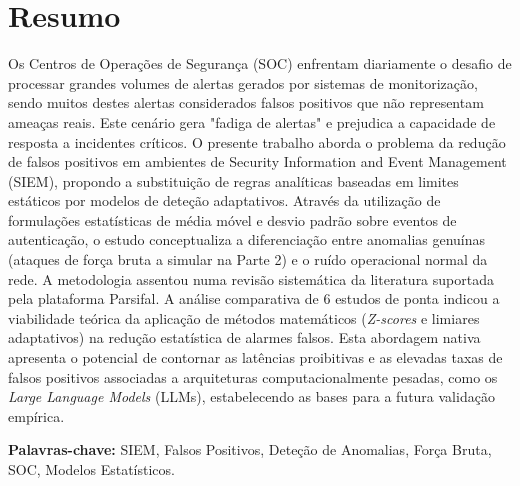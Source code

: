 \documentclass[12pt,a4paper]{article}
\begin{document}
\section*{Resumo}
Os Centros de Operações de Segurança (SOC) enfrentam diariamente o desafio de processar grandes volumes de alertas gerados por sistemas de monitorização, sendo muitos destes alertas considerados falsos positivos que não representam ameaças reais. Este cenário gera "fadiga de alertas" e prejudica a capacidade de resposta a incidentes críticos. O presente trabalho aborda o problema da redução de falsos positivos em ambientes de Security Information and Event Management (SIEM), propondo a substituição de regras analíticas baseadas em limites estáticos por modelos de deteção adaptativos. Através da utilização de formulações estatísticas de média móvel e desvio padrão sobre eventos de autenticação, o estudo conceptualiza a diferenciação entre anomalias genuínas (ataques de força bruta a simular na Parte 2) e o ruído operacional normal da rede. A metodologia assentou numa revisão sistemática da literatura suportada pela plataforma Parsifal. A análise comparativa de 6 estudos de ponta indicou a viabilidade teórica da aplicação de métodos matemáticos (\textit{Z-scores} e limiares adaptativos) na redução estatística de alarmes falsos. Esta abordagem nativa apresenta o potencial de contornar as latências proibitivas e as elevadas taxas de falsos positivos associadas a arquiteturas computacionalmente pesadas, como os \textit{Large Language Models} (LLMs), estabelecendo as bases para a futura validação empírica.

\vspace{1em}
\noindent\textbf{Palavras-chave:} SIEM, Falsos Positivos, Deteção de Anomalias, Força Bruta, SOC, Modelos Estatísticos.

\newpage
\renewcommand{\contentsname}{Índice}
\tableofcontents

\newpage
\end{document}
